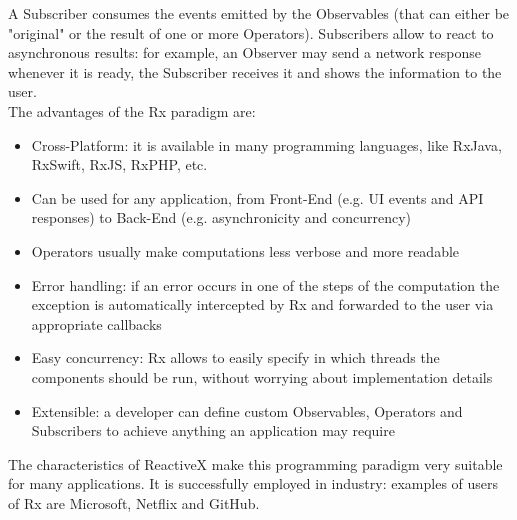 \documentclass[11pt,a4paper,notitlepage]{article}
\begin{document}
A Subscriber consumes the events emitted by the Observables (that can either be "original" or the result of one or more Operators). Subscribers allow to react to asynchronous results: for example, an Observer may send a network response whenever it is ready, the Subscriber receives it and shows the information to the user.\bigskip \\
The advantages of the Rx paradigm are:
\begin{itemize}
	\item Cross-Platform: it is available in many programming languages, like RxJava, RxSwift, RxJS, RxPHP, etc.
	\item Can be used for any application, from Front-End (e.g. UI events and API responses) to Back-End (e.g. asynchronicity and concurrency)
	\item Operators usually make computations less verbose and more readable
	\item Error handling: if an error occurs in one of the steps of the computation the exception is automatically intercepted by Rx and forwarded to the user via appropriate callbacks
	\item Easy concurrency: Rx allows to easily specify in which threads the components should be run, without worrying about implementation details
	\item Extensible: a developer can define custom Observables, Operators and Subscribers to achieve anything an application may require
\end{itemize}
The characteristics of ReactiveX make this programming paradigm very suitable for many applications. It is successfully employed in industry: examples of users of Rx are Microsoft, Netflix and GitHub.
\end{document}

